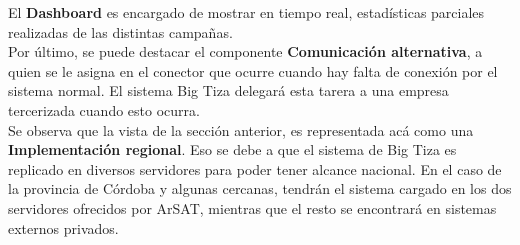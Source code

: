 \documentclass[a4paper, 11pt]{article}
\begin{document}
El \textbf{Dashboard} es encargado de mostrar en tiempo real, estadísticas parciales realizadas de las distintas campañas. \\

Por último, se puede destacar el componente \textbf{Comunicación alternativa}, a quien se le asigna en el conector que ocurre cuando hay falta de conexión por el sistema normal. El sistema Big Tiza delegará esta tarera a una empresa tercerizada cuando esto ocurra. \\

Se observa que la vista de la sección anterior, es representada acá como una \textbf{Implementación regional}. Eso se debe a que el sistema de Big Tiza es replicado en diversos servidores para poder tener alcance nacional. En el caso de la provincia de Córdoba y algunas cercanas, tendrán el sistema cargado en los dos servidores ofrecidos por ArSAT, mientras que el resto se encontrará en sistemas externos privados. \\


\newpage


\newpage



%
%

\newpage


\end{document}
